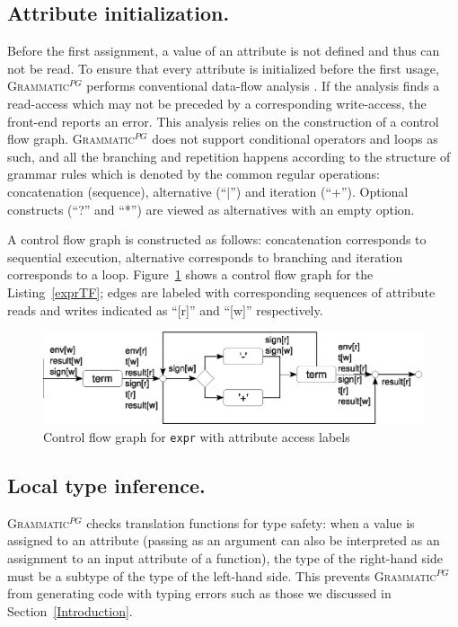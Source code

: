 \documentclass{informat} %
\newcommand{\lstref}[1]{Listing~\ref{#1}}
\newcommand{\figref}[1]{Figure~\ref{#1}}
\newcommand{\secref}[1]{Section~\ref{#1}}
\newcommand{\ATF}{\textsc{Grammatic}$^{PG}$}
\begin{document}
\subsection{Attribute initialization.}

Before the first assignment, a value of an attribute is not defined and thus can not be read. To ensure that every attribute is initialized before the first usage, \ATF{} performs conventional data-flow analysis \cite{DataFlow}.
If the analysis finds a read-access which may not be preceded by a corresponding write-access, the front-end reports an error. This analysis relies on the construction of a control flow graph. \ATF{} does not support conditional operators and loops as such, and all the branching and repetition happens according to the structure of grammar rules which is denoted by the common regular operations: concatenation (sequence), alternative (``$|$'') and iteration (``+''). Optional constructs (``?'' and ``*'') are viewed as alternatives with an empty option.

A control flow graph is constructed as follows: concatenation corresponds to sequential execution, alternative corresponds to branching and iteration corresponds to a loop. \figref{cfg} shows a control flow graph for the \lstref{exprTF}; edges are labeled with corresponding sequences of attribute reads and writes indicated as ``[r]'' and ``[w]'' respectively.

\begin{figure}[h!]
	\includegraphics[width=\textwidth]{cfg}
	\caption{Control flow graph for \texttt{expr} with attribute access labels}\label{cfg}
\end{figure}


\subsection{Local type inference.}\label{TypeInf}

\ATF{} checks translation functions for type safety: when a value is assigned to an attribute (passing as an argument can also be interpreted as an assignment to an input attribute of a function), the type of the right-hand side must be a subtype of the type of the left-hand side. This prevents \ATF{} from generating code with typing errors such as those we discussed in \secref{Introduction}.
\end{document}
